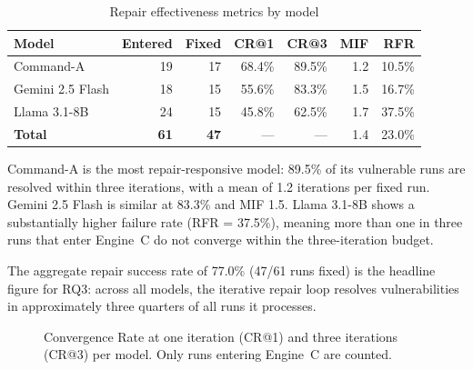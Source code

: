 \documentclass[12pt,a4paper]{report}
\begin{document}
\begin{table}[H]
\centering
\caption{Repair effectiveness metrics by model}
\label{tab:repair}
\renewcommand{\arraystretch}{1.3}
\begin{tabular}{@{}lrrrrrr@{}}
\toprule
\textbf{Model} & \textbf{Entered} & \textbf{Fixed}
               & \textbf{CR@1} & \textbf{CR@3}
               & \textbf{MIF}  & \textbf{RFR} \\
\midrule
Command-A         & 19 & 17 & 68.4\% & 89.5\% & 1.2 & 10.5\% \\
Gemini 2.5 Flash  & 18 & 15 & 55.6\% & 83.3\% & 1.5 & 16.7\% \\
Llama 3.1-8B      & 24 & 15 & 45.8\% & 62.5\% & 1.7 & 37.5\% \\
\midrule
\textbf{Total}    & \textbf{61} & \textbf{47} & --- & --- & 1.4 & 23.0\% \\
\bottomrule
\end{tabular}
\end{table}

Command-A is the most repair-responsive model: 89.5\% of its vulnerable runs
are resolved within three iterations, with a mean of 1.2 iterations per fixed
run. Gemini 2.5 Flash is similar at 83.3\% and MIF 1.5. Llama 3.1-8B shows
a substantially higher failure rate (RFR = 37.5\%), meaning more than one in
three runs that enter Engine~C do not converge within the three-iteration budget.

The aggregate repair success rate of 77.0\% (47/61 runs fixed) is the headline
figure for RQ3: across all models, the iterative repair loop resolves
vulnerabilities in approximately three quarters of all runs it processes.

\begin{figure}[H]
\centering
{}
\caption{Convergence Rate at one iteration (CR@1) and three iterations (CR@3)
         per model. Only runs entering Engine~C are counted.}
\label{fig:cr_chart}
\end{figure}
\end{document}
